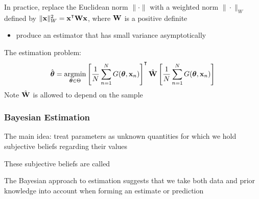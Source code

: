 \begin{frame}

    \vspace{2em}
    In practice, replace the
    Euclidean norm $\| \cdot \|$ with a weighted norm $\|
    \cdot \|_W$ defined by $\| \boldx \|_W^2 = \boldx^\T \boldW \boldx$,
    where $\mathbf W$ is a positive definite 
    \begin{itemize}
        \item  produce an estimator that has small variance asymptotically
    \end{itemize}

    \vspace{.7em}
    The estimation problem:
    \begin{equation*}
        \label{eq:gmme3}
        \hat \boldtheta 
        = \argmin_{\boldtheta \in \Theta} 
        \left[ \frac{1}{N} \sum_{n=1}^N G(\boldtheta, \boldx_n) \right]^\T
        \hat \boldW
        \left[ \frac{1}{N} \sum_{n=1}^N G(\boldtheta, \boldx_n) \right]
    \end{equation*}
    Note $\hat {\mathbf W}$ is allowed
    to depend on the sample

\end{frame}

\begin{frame}\frametitle{Bayesian Estimation}

    \vspace{2em}
    The main idea: treat parameters as unknown quantities
    for which we hold subjective beliefs regarding their values
    
    \vspace{.7em}
    These
    subjective beliefs are called  
    
    \vspace{.7em}
    The Bayesian approach to
    estimation suggests that we take both data and prior knowledge into account
    when forming an estimate or prediction
    
\end{frame}

